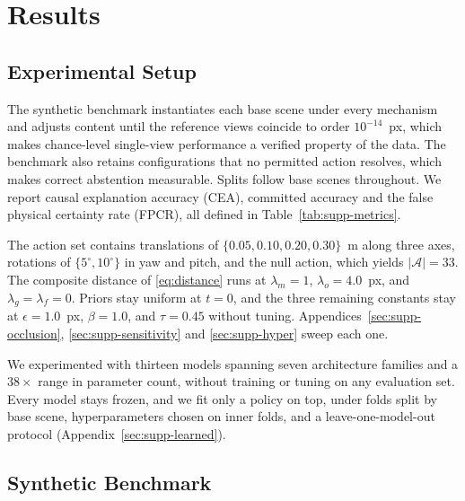 \documentclass{article} %
\theoremstyle{defstyle}
\theoremstyle{plain}
\begin{document}
\section{Results}
\label{sec:results}

\subsection{Experimental Setup}
\label{sec:setup}

The synthetic benchmark instantiates each base scene under every mechanism and adjusts content
until the reference views coincide to order $10^{-14}$~px, which makes chance-level single-view
performance a verified property of the data. The benchmark also retains configurations that no
permitted action resolves, which makes correct abstention measurable. Splits follow base scenes
throughout. We report causal explanation accuracy (CEA), committed accuracy and the false physical
certainty rate (FPCR), all defined in Table~\ref{tab:supp-metrics}.

The action set contains translations of $\{0.05, 0.10, 0.20, 0.30\}$~m along three axes,
rotations of $\{5^\circ, 10^\circ\}$ in yaw and pitch, and the null action, which yields
$|\mathcal{A}| = 33$. The composite distance of \eqref{eq:distance} runs at $\lambda_m = 1$,
$\lambda_o = 4.0$~px, and $\lambda_g = \lambda_f = 0$. Priors stay uniform at $t = 0$, and the
three remaining constants stay at $\epsilon = 1.0$~px, $\beta = 1.0$, and $\tau = 0.45$ without tuning. Appendices~\ref{sec:supp-occlusion}, \ref{sec:supp-sensitivity} and
\ref{sec:supp-hyper} sweep each one.

We experimented with thirteen models spanning seven architecture families and a $38\times$
range in parameter count, without training or tuning on any evaluation set. Every model stays
frozen, and we fit only a policy on top, under folds split by base scene, hyperparameters
chosen on inner folds, and a leave-one-model-out protocol (Appendix~\ref{sec:supp-learned}).

\subsection{Synthetic Benchmark}
\label{sec:res-synth}
\end{document}
